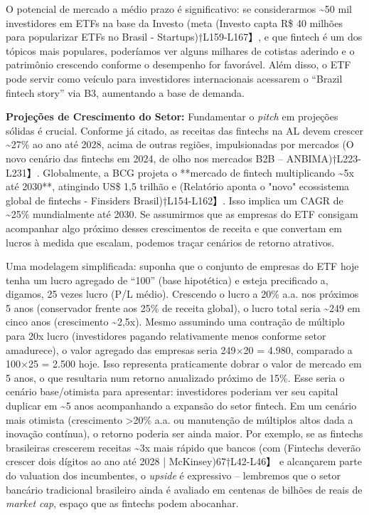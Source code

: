 \documentclass[12pt]{article}
\begin{document}
O potencial de mercado a médio prazo é significativo: se considerarmos \textasciitilde50 mil investidores em ETFs na base da Investo (meta (Investo capta R\$ 40 milhões para popularizar ETFs no Brasil - Startups)†L159-L167】, e que fintech é um dos tópicos mais populares, poderíamos ver alguns milhares de cotistas aderindo e o patrimônio crescendo conforme o desempenho for favorável. Além disso, o ETF pode servir como veículo para investidores internacionais acessarem o “Brazil fintech story” via B3, aumentando a base de demanda.

\textbf{Projeções de Crescimento do Setor:} Fundamentar o \textit{pitch} em projeções sólidas é crucial. Conforme já citado, as receitas das fintechs na AL devem crescer \textasciitilde27\% ao ano até 2028, acima de outras regiões, impulsionadas por mercados (O novo cenário das fintechs em 2024, de olho nos mercados B2B – ANBIMA)†L223-L231】. Globalmente, a BCG projeta o **mercado de fintech multiplicando \textasciitilde5x até 2030**, atingindo US\$ 1,5 trilhão e (Relatório aponta o "novo" ecossistema global de fintechs - Finsiders Brasil)†L154-L162】. Isso implica um CAGR de \textasciitilde25\% mundialmente até 2030. Se assumirmos que as empresas do ETF consigam acompanhar algo próximo desses crescimentos de receita e que convertam em lucros à medida que escalam, podemos traçar cenários de retorno atrativos.

Uma modelagem simplificada: suponha que o conjunto de empresas do ETF hoje tenha um lucro agregado de “100” (base hipotética) e esteja precificado a, digamos, 25 vezes lucro (P/L médio). Crescendo o lucro a 20\% a.a. nos próximos 5 anos (conservador frente aos 25\% de receita global), o lucro total seria \textasciitilde249 em cinco anos (crescimento \textasciitilde2,5x). Mesmo assumindo uma contração de múltiplo para 20x lucro (investidores pagando relativamente menos conforme setor amadurece), o valor agregado das empresas seria 249$\times$20 = 4.980, comparado a 100$\times$25 = 2.500 hoje. Isso representa praticamente dobrar o valor de mercado em 5 anos, o que resultaria num retorno anualizado próximo de 15\%. Esse seria o cenário base/otimista para apresentar: investidores poderiam ver seu capital duplicar em \textasciitilde5 anos acompanhando a expansão do setor fintech. Em um cenário mais otimista (crescimento >20\% a.a. ou manutenção de múltiplos altos dada a inovação contínua), o retorno poderia ser ainda maior. Por exemplo, se as fintechs brasileiras crescerem receitas \textasciitilde3x mais rápido que bancos (com (Fintechs deverão crescer dois dígitos ao ano até 2028 | McKinsey)67†L42-L46】 e alcançarem parte do valuation dos incumbentes, o \textit{upside} é expressivo – lembremos que o setor bancário tradicional brasileiro ainda é avaliado em centenas de bilhões de reais de \textit{market cap}, espaço que as fintechs podem abocanhar.
\end{document}
